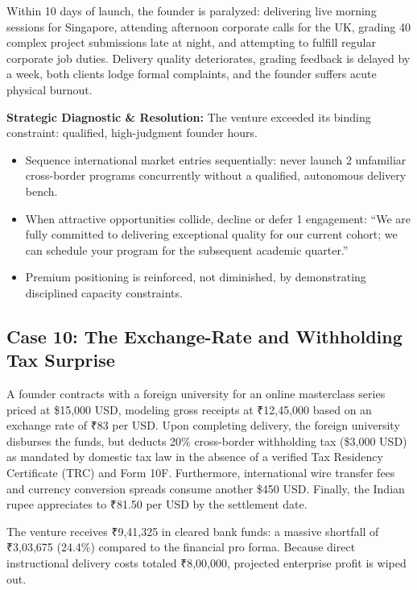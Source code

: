 Within 10 days of launch, the founder is paralyzed: delivering live morning sessions for Singapore, attending afternoon corporate calls for the UK, grading 40 complex project submissions late at night, and attempting to fulfill regular corporate job duties. Delivery quality deteriorates, grading feedback is delayed by a week, both clients lodge formal complaints, and the founder suffers acute physical burnout.

\textbf{Strategic Diagnostic \& Resolution:} The venture exceeded its binding constraint: qualified, high-judgment founder hours.
\begin{itemize}
\item Sequence international market entries sequentially: never launch 2 unfamiliar cross-border programs concurrently without a qualified, autonomous delivery bench.
\item When attractive opportunities collide, decline or defer 1 engagement: ``We are fully committed to delivering exceptional quality for our current cohort; we can schedule your program for the subsequent academic quarter.''
\item Premium positioning is reinforced, not diminished, by demonstrating disciplined capacity constraints.
\end{itemize}

\subsection{Case 10: The Exchange-Rate and Withholding Tax Surprise}
\label{sec:case10_exchange_rate_withholding_surprise}

A founder contracts with a foreign university for an online masterclass series priced at \$15,000 USD, modeling gross receipts at ₹12,45,000 based on an exchange rate of ₹83 per USD. Upon completing delivery, the foreign university disburses the funds, but deducts 20\% cross-border withholding tax (\$3,000 USD) as mandated by domestic tax law in the absence of a verified Tax Residency Certificate (TRC) and Form 10F. Furthermore, international wire transfer fees and currency conversion spreads consume another \$450 USD. Finally, the Indian rupee appreciates to ₹81.50 per USD by the settlement date.

The venture receives ₹9,41,325 in cleared bank funds: a massive shortfall of ₹3,03,675 (24.4\%) compared to the financial pro forma. Because direct instructional delivery costs totaled ₹8,00,000, projected enterprise profit is wiped out.

